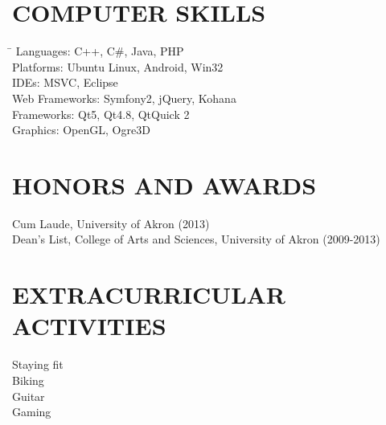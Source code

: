 \documentclass{res}
\begin{document}
\begin{resume}
\section{COMPUTER SKILLS}
  \vspace{-0.1in}
  \begin{tabbing}
  \hspace{2.3in} \= \kill
  Languages: \>  C++, C\#, Java, PHP \\
  Platforms: \> Ubuntu Linux, Android, Win32 \\
  IDEs: \> MSVC, Eclipse \\
  Web Frameworks: \> Symfony2, jQuery, Kohana \\
  Frameworks: \> Qt5, Qt4.8, QtQuick 2 \\
  Graphics: \> OpenGL, Ogre3D
  \end{tabbing}

\section{HONORS AND AWARDS}          
    Cum Laude, University of Akron (2013) \\
    Dean's List, College of Arts and Sciences, University of Akron (2009-2013)         
 
\section{EXTRACURRICULAR ACTIVITIES}          
    Staying fit \\
    Biking \\
    Guitar \\
    Gaming  
 
\end{resume}
\end{document}
